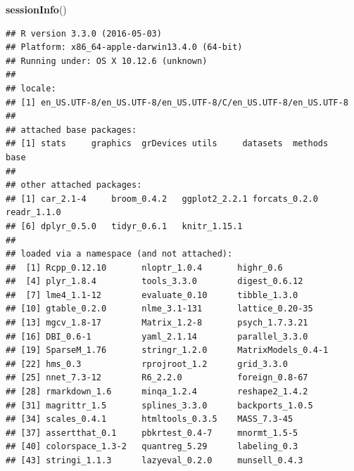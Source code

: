 \documentclass[]{article}
\newenvironment{Shaded}{\begin{snugshade}}{\end{snugshade}}
\newcommand{\KeywordTok}[1]{\textcolor[rgb]{0.13,0.29,0.53}{\textbf{{#1}}}}
\newcommand{\NormalTok}[1]{{#1}}
\begin{document}
\begin{Shaded}
\begin{Highlighting}[]
\KeywordTok{sessionInfo}\NormalTok{()}
\end{Highlighting}
\end{Shaded}

\begin{verbatim}
## R version 3.3.0 (2016-05-03)
## Platform: x86_64-apple-darwin13.4.0 (64-bit)
## Running under: OS X 10.12.6 (unknown)
## 
## locale:
## [1] en_US.UTF-8/en_US.UTF-8/en_US.UTF-8/C/en_US.UTF-8/en_US.UTF-8
## 
## attached base packages:
## [1] stats     graphics  grDevices utils     datasets  methods   base     
## 
## other attached packages:
## [1] car_2.1-4     broom_0.4.2   ggplot2_2.2.1 forcats_0.2.0 readr_1.1.0  
## [6] dplyr_0.5.0   tidyr_0.6.1   knitr_1.15.1 
## 
## loaded via a namespace (and not attached):
##  [1] Rcpp_0.12.10       nloptr_1.0.4       highr_0.6         
##  [4] plyr_1.8.4         tools_3.3.0        digest_0.6.12     
##  [7] lme4_1.1-12        evaluate_0.10      tibble_1.3.0      
## [10] gtable_0.2.0       nlme_3.1-131       lattice_0.20-35   
## [13] mgcv_1.8-17        Matrix_1.2-8       psych_1.7.3.21    
## [16] DBI_0.6-1          yaml_2.1.14        parallel_3.3.0    
## [19] SparseM_1.76       stringr_1.2.0      MatrixModels_0.4-1
## [22] hms_0.3            rprojroot_1.2      grid_3.3.0        
## [25] nnet_7.3-12        R6_2.2.0           foreign_0.8-67    
## [28] rmarkdown_1.6      minqa_1.2.4        reshape2_1.4.2    
## [31] magrittr_1.5       splines_3.3.0      backports_1.0.5   
## [34] scales_0.4.1       htmltools_0.3.5    MASS_7.3-45       
## [37] assertthat_0.1     pbkrtest_0.4-7     mnormt_1.5-5      
## [40] colorspace_1.3-2   quantreg_5.29      labeling_0.3      
## [43] stringi_1.1.3      lazyeval_0.2.0     munsell_0.4.3
\end{verbatim}
\end{document}
